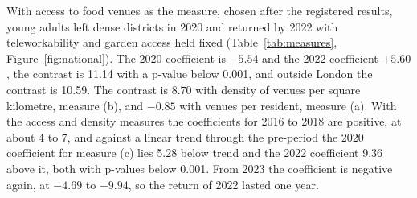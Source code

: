 \documentclass[11pt,a4paper]{article}
\begin{document}
With access to food venues as the measure, chosen after the registered results, young adults left dense districts in 2020 and returned by 2022 with teleworkability and garden access held fixed (Table~\ref{tab:measures}, Figure~\ref{fig:national}). The 2020 coefficient is $-5.54$ and the 2022 coefficient $+5.60$, the contrast is 11.14 with a p-value below 0.001, and outside London the contrast is 10.59. The contrast is 8.70 with density of venues per square kilometre, measure (b), and $-0.85$ with venues per resident, measure (a). With the access and density measures the coefficients for 2016 to 2018 are positive, at about 4 to 7, and against a linear trend through the pre-period the 2020 coefficient for measure (c) lies 5.28 below trend and the 2022 coefficient 9.36 above it, both with p-values below 0.001. From 2023 the coefficient is negative again, at $-4.69$ to $-9.94$, so the return of 2022 lasted one year.
\end{document}
